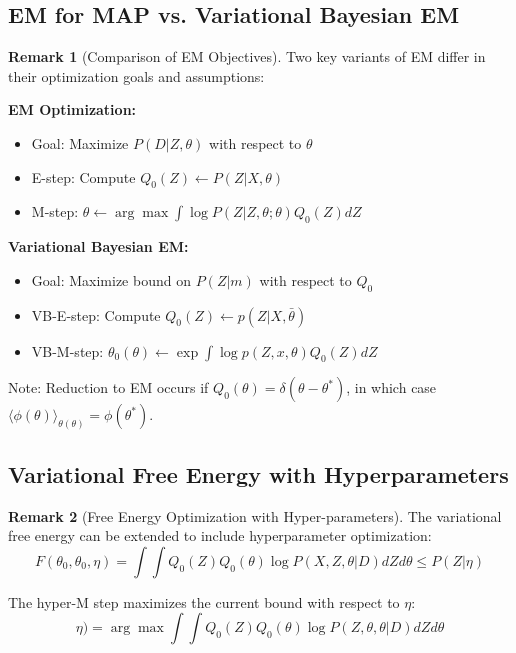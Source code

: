 \documentclass[12pt,a4paper]{article}
\theoremstyle{definition}
\newtheorem{remark}{Remark}[section]
\begin{document}
\subsection{EM for MAP vs. Variational Bayesian EM}

\begin{remark}[Comparison of EM Objectives]
Two key variants of EM differ in their optimization goals and assumptions:

\textbf{EM Optimization:}
\begin{itemize}
    \item Goal: Maximize $P(D | Z, \theta)$ with respect to $\theta$
    \item E-step: Compute $Q_0(Z) \leftarrow P(Z | X, \theta)$
    \item M-step: $\theta \leftarrow \arg\max \int \log P(Z | Z, \theta; \theta) Q_0(Z) d Z$
\end{itemize}

\textbf{Variational Bayesian EM:}
\begin{itemize}
    \item Goal: Maximize bound on $P(Z | m)$ with respect to $Q_0$
    \item VB-E-step: Compute $Q_0(Z) \leftarrow p(Z | X, \bar{\theta})$
    \item VB-M-step: $\theta_0(\theta) \leftarrow \exp \int \log p(Z, x, \theta) Q_0(Z) dZ$
\end{itemize}

Note: Reduction to EM occurs if $Q_0(\theta) = \delta(\theta - \theta^*)$, in which case $\langle \phi(\theta) \rangle_{\theta(\theta)} = \phi(\theta^*)$.
\end{remark}

\subsection{Variational Free Energy with Hyperparameters}

\begin{remark}[Free Energy Optimization with Hyper-parameters]
The variational free energy can be extended to include hyperparameter optimization:
\[
F(\theta_0, \theta_0, \eta) = \int\int Q_0(Z) Q_0(\theta) \log P(X, Z, \theta | D) dZ d\theta \leq P(Z | \eta)
\]

The hyper-M step maximizes the current bound with respect to $\eta$:
\[
\eta) = \arg\max \int\int Q_0(Z) Q_0(\theta) \log P(Z, \theta, \theta | D) dZ d\theta
\]
\end{remark}
\end{document}
